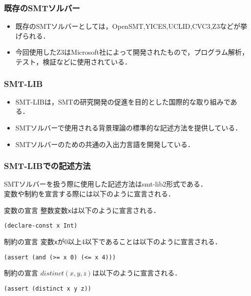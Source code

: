\begin{frame}
    \frametitle{既存のSMTソルバー}
    \begin{itemize}
        \item 既存のSMTソルバーとしては，OpenSMT,YICES,UCLID,CVC3,Z3などが挙げられる．\\
        \item 今回使用したZ3はMicrosoft社によって開発されたもので，プログラム解析，テスト，検証などに使用されている．
    \end{itemize}
\end{frame}


\begin{frame}[fragile]\small
    \frametitle{SMT-LIB}
    \begin{itemize}
        \item SMT-LIBは，SMTの研究開発の促進を目的とした国際的な取り組みである．
        \item SMTソルバーで使用される背景理論の標準的な記述方法を提供している．
        \item SMTソルバーのための共通の入出力言語を開発している．
    \end{itemize}
\end{frame}

\begin{frame}[fragile]\small
    \frametitle{SMT-LIBでの記述方法}
    SMTソルバーを扱う際に使用した記述方法はsmt-lib2形式である．\\
    変数や制約を宣言する際には以下のように宣言される．
    \begin{exampleblock}{変数の宣言}
        整数変数\verb|x|は以下のように宣言される．
\begin{verbatim}
(declare-const x Int)
\end{verbatim}
    \end{exampleblock}
    \begin{exampleblock}{制約の宣言}
        変数\verb|x|が0以上4以下であることは以下のように宣言される．
\begin{verbatim}
(assert (and (>= x 0) (<= x 4)))
\end{verbatim}
    \end{exampleblock}
    \begin{exampleblock}{\distinct 制約の宣言}
        $distinct(x,y,z)$は以下のように宣言される．
\begin{verbatim}
(assert (distinct x y z))
\end{verbatim}
    \end{exampleblock}
\end{frame}


